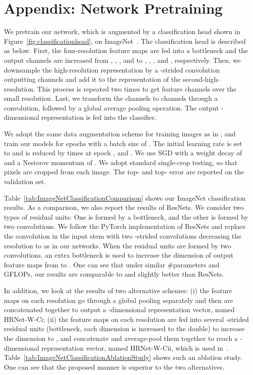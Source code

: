 \documentclass[10pt,twocolumn,letterpaper]{article}
\begin{document}
\section*{Appendix: Network Pretraining}
We pretrain our network,
which is augmented by a classification head shown in Figure~\ref{fig:classificationhead},
on ImageNet~\cite{RussakovskyDSKS15}.
The classification head is described as below.
First, the four-resolution feature maps are fed into
a bottleneck and the output channels are
increased
from
, , , and 
to , , , and , respectively.
Then, we downsample the high-resolution representation
by a -strided  convolution
outputting  channels
and add it to the representation of the second-high-resolution.
This process is repeated two times
to get  feature channels over the small resolution.
Last, we transform the  channels to  channels
through a  convolution, followed by a global average pooling operation.
The output -dimensional representation is fed into the classifier.

We adopt the same data augmentation scheme for training images as in \cite{HeZRS16},
and train our models for  epochs with a batch size of .
The initial learning rate is set to 
and is reduced by  times at epoch ,  and .
We use SGD with a weight decay of  and a Nesterov momentum of . We adopt standard single-crop testing, so that  pixels are cropped from each image. The top-
and top- error are reported on the validation set.

Table~\ref{tab:ImageNetClassificationComparison}
shows our ImageNet classification results.
As a comparison, we also report the results of ResNets.
We consider two types of residual units:
One is formed by a bottleneck,
and the other is formed by two  convolutions. We follow the
PyTorch implementation of ResNets and replace the 
convolution in the input stem with two
-strided  convolutions decreasing the resolution to 
as in our networks. When the residual units are formed by two  convolutions,
an extra bottleneck is used to increase the dimension of output feature maps from  to .
One can see that under similar \#parameters
and GFLOPs, our results are comparable to and slightly better
than ResNets.

In addition, we look at the results
of two alternative schemes:
(i) the feature maps on each resolution go through a global pooling separately and then are concatenated
together to output a -dimensional representation vector,
named HRNet-W-Ci;
(ii) the feature maps on each resolution are fed into several -strided residual units (bottleneck, each dimension is increased to the double)
to increase the dimension to ,
and concatenate and average-pool them together to reach a -dimensional representation vector,
named HRNet-W-Cii,
which is used in~\cite{SunXLW19}.
Table~\ref{tab:ImageNetClassificationAblationStudy}
shows such an ablation study.
One can see that the proposed manner is superior to the two alternatives.
\end{document}

